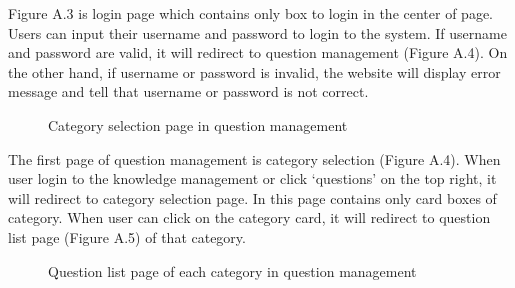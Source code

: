 \documentclass[12pt,oneside,openright,a4paper]{cpe-english-project}
\begin{document}
Figure A.3 is login page which contains only box to login in the center of page. Users 
can input their username and password to login to the system. If username and password are 
valid, it will redirect to question management (Figure A.4). On the other hand, if username 
or password is invalid, the website will display error message and tell that username or 
password is not correct.

\begin{figure}[!h]\centering
{}
\caption{Category selection page in question management}
\label{fig:Category selection page in question management}
\end{figure}

The first page of question management is category selection (Figure A.4). When user 
login to the knowledge management or click ‘questions’ on the top right, it will redirect to 
category selection page. In this page contains only card boxes of category. When user can 
click on the category card, it will redirect to question list page (Figure A.5) of that category.

\begin{figure}[!h]
	\centering
	\caption{Question list page of each category in question management}
	\label{fig:Question list page of each category in question management}
\end{figure}
\end{document}
